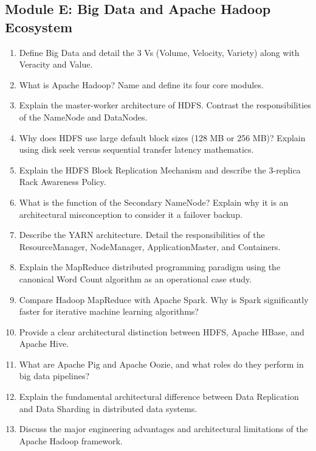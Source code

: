 \subsection{Module E: Big Data and Apache Hadoop Ecosystem}
\begin{enumerate}[resume]
    \item Define Big Data and detail the 3 Vs (Volume, Velocity, Variety) along with Veracity and Value.
    \item What is Apache Hadoop? Name and define its four core modules.
    \item Explain the master-worker architecture of HDFS. Contrast the responsibilities of the NameNode and DataNodes.
    \item Why does HDFS use large default block sizes (128 MB or 256 MB)? Explain using disk seek versus sequential transfer latency mathematics.
    \item Explain the HDFS Block Replication Mechanism and describe the 3-replica Rack Awareness Policy.
    \item What is the function of the Secondary NameNode? Explain why it is an architectural misconception to consider it a failover backup.
    \item Describe the YARN architecture. Detail the responsibilities of the ResourceManager, NodeManager, ApplicationMaster, and Containers.
    \item Explain the MapReduce distributed programming paradigm using the canonical Word Count algorithm as an operational case study.
    \item Compare Hadoop MapReduce with Apache Spark. Why is Spark significantly faster for iterative machine learning algorithms?
    \item Provide a clear architectural distinction between HDFS, Apache HBase, and Apache Hive.
    \item What are Apache Pig and Apache Oozie, and what roles do they perform in big data pipelines?
    \item Explain the fundamental architectural difference between Data Replication and Data Sharding in distributed data systems.
    \item Discuss the major engineering advantages and architectural limitations of the Apache Hadoop framework.
\end{enumerate}



